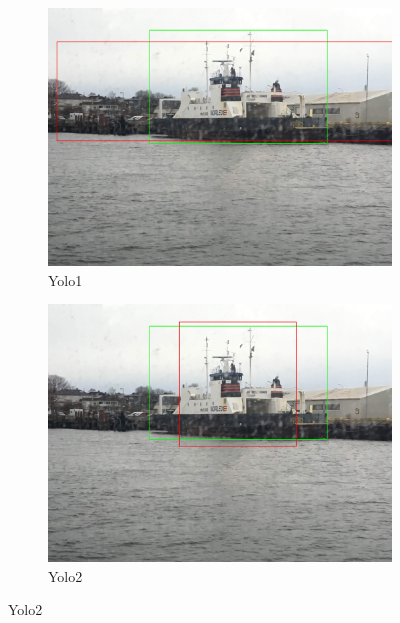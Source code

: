 \begin{figure}[h!]
\begin{subfigure}{.5\textwidth}
  \centering
  \includegraphics[width=0.75\linewidth]{results/case_tr_moor/yolo12/yolo1/big/IMG_2566.jpg}
  \caption{Yolo1}
\end{subfigure}%
\begin{subfigure}{.5\textwidth}
  \centering
  \includegraphics[width=.75\linewidth]{results/case_tr_moor/yolo12/yolo2/big/IMG_2566.jpg}
  \caption{Yolo2}
\end{subfigure}


\end{figure}
